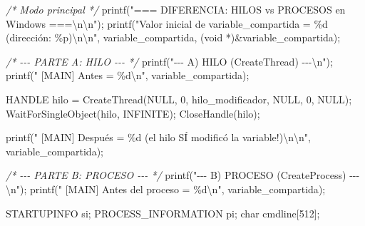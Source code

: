 \documentclass[
  spanish,
]{article}
\newenvironment{Shaded}{}{}
\newcommand{\CommentTok}[1]{\textcolor[rgb]{0.38,0.63,0.69}{\textit{#1}}}
\newcommand{\DataTypeTok}[1]{\textcolor[rgb]{0.56,0.13,0.00}{#1}}
\newcommand{\DecValTok}[1]{\textcolor[rgb]{0.25,0.63,0.44}{#1}}
\newcommand{\NormalTok}[1]{#1}
\newcommand{\OperatorTok}[1]{\textcolor[rgb]{0.40,0.40,0.40}{#1}}
\newcommand{\SpecialCharTok}[1]{\textcolor[rgb]{0.25,0.44,0.63}{#1}}
\newcommand{\StringTok}[1]{\textcolor[rgb]{0.25,0.44,0.63}{#1}}
\begin{document}
\begin{Shaded}
\begin{Highlighting}[]
    \CommentTok{/* Modo principal */}
\NormalTok{    printf}\OperatorTok{(}\StringTok{"=== DIFERENCIA: HILOS vs PROCESOS en Windows ===}\SpecialCharTok{\textbackslash{}n\textbackslash{}n}\StringTok{"}\OperatorTok{);}
\NormalTok{    printf}\OperatorTok{(}\StringTok{"Valor inicial de variable\_compartida = }\SpecialCharTok{\%d}\StringTok{ (dirección: }\SpecialCharTok{\%p}\StringTok{)}\SpecialCharTok{\textbackslash{}n\textbackslash{}n}\StringTok{"}\OperatorTok{,}
\NormalTok{           variable\_compartida}\OperatorTok{,} \OperatorTok{(}\DataTypeTok{void} \OperatorTok{*)\&}\NormalTok{variable\_compartida}\OperatorTok{);}

    \CommentTok{/* {-}{-}{-} PARTE A: HILO {-}{-}{-} */}
\NormalTok{    printf}\OperatorTok{(}\StringTok{"{-}{-}{-} A) HILO (CreateThread) {-}{-}{-}}\SpecialCharTok{\textbackslash{}n}\StringTok{"}\OperatorTok{);}
\NormalTok{    printf}\OperatorTok{(}\StringTok{"  [MAIN]  Antes = }\SpecialCharTok{\%d\textbackslash{}n}\StringTok{"}\OperatorTok{,}\NormalTok{ variable\_compartida}\OperatorTok{);}

\NormalTok{    HANDLE hilo }\OperatorTok{=}\NormalTok{ CreateThread}\OperatorTok{(}\NormalTok{NULL}\OperatorTok{,} \DecValTok{0}\OperatorTok{,}\NormalTok{ hilo\_modificador}\OperatorTok{,}\NormalTok{ NULL}\OperatorTok{,} \DecValTok{0}\OperatorTok{,}\NormalTok{ NULL}\OperatorTok{);}
\NormalTok{    WaitForSingleObject}\OperatorTok{(}\NormalTok{hilo}\OperatorTok{,}\NormalTok{ INFINITE}\OperatorTok{);}
\NormalTok{    CloseHandle}\OperatorTok{(}\NormalTok{hilo}\OperatorTok{);}

\NormalTok{    printf}\OperatorTok{(}\StringTok{"  [MAIN]  Después = }\SpecialCharTok{\%d}\StringTok{  (el hilo SÍ modificó la variable!)}\SpecialCharTok{\textbackslash{}n\textbackslash{}n}\StringTok{"}\OperatorTok{,}
\NormalTok{           variable\_compartida}\OperatorTok{);}

    \CommentTok{/* {-}{-}{-} PARTE B: PROCESO {-}{-}{-} */}
\NormalTok{    printf}\OperatorTok{(}\StringTok{"{-}{-}{-} B) PROCESO (CreateProcess) {-}{-}{-}}\SpecialCharTok{\textbackslash{}n}\StringTok{"}\OperatorTok{);}
\NormalTok{    printf}\OperatorTok{(}\StringTok{"  [MAIN]  Antes del proceso = }\SpecialCharTok{\%d\textbackslash{}n}\StringTok{"}\OperatorTok{,}\NormalTok{ variable\_compartida}\OperatorTok{);}

\NormalTok{    STARTUPINFO si}\OperatorTok{;}
\NormalTok{    PROCESS\_INFORMATION pi}\OperatorTok{;}
    \DataTypeTok{char}\NormalTok{ cmdline}\OperatorTok{[}\DecValTok{512}\OperatorTok{];}


\end{Highlighting}
\end{Shaded}
\end{document}
